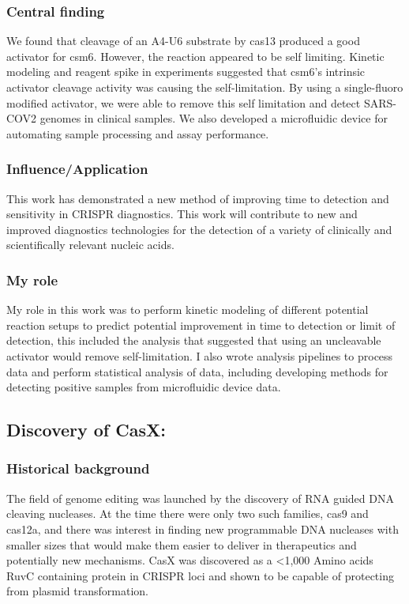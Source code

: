 \documentclass{article}
\begin{document}
\subsubsection{Central finding}
We found that cleavage of an A4-U6 substrate by cas13 produced a good activator for csm6.
However, the reaction appeared to be self limiting.
Kinetic modeling and reagent spike in experiments suggested that csm6's intrinsic activator cleavage activity was causing the self-limitation.
By using a single-fluoro modified activator, we were able to remove this self limitation and detect SARS-COV2 genomes in clinical samples.
We also developed a microfluidic device for automating sample processing and assay performance.
%
\subsubsection{Influence/Application}
This work has demonstrated a new method of improving time to detection and sensitivity in CRISPR diagnostics. 
This work will contribute to new and improved diagnostics technologies for the detection of a variety of clinically and scientifically relevant nucleic acids.
%
\subsubsection{My role}
My role in this work was to perform kinetic modeling of different potential reaction setups to predict potential improvement in time to detection or limit of detection, this included the analysis that suggested that using an uncleavable activator would remove self-limitation.
I also wrote analysis pipelines to process data and perform statistical analysis of data, including developing methods for detecting positive samples from microfluidic device data.
%
\nocite{Liu2021-pu}
\printbibliography[heading=none]

\leavevmode\pagebreak


\newrefsection
\subsection{Discovery of CasX:}
\subsubsection{Historical background}
The field of genome editing was launched by the discovery of RNA guided DNA cleaving nucleases.
At the time there were only two such families, cas9 and cas12a, and there was interest in finding new programmable DNA nucleases with smaller sizes that would make them easier to deliver in therapeutics and potentially new mechanisms.
CasX was discovered as a <1,000 Amino acids RuvC containing protein in CRISPR loci and shown to be capable of protecting from plasmid transformation.
%
\end{document}
